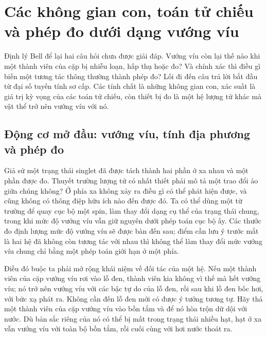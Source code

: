 \chapter{Các không gian con, toán tử chiếu và phép đo dưới dạng vướng víu}

Định lý Bell để lại hai câu hỏi chưa được giải đáp. Vướng víu còn lại thế nào khi một thành viên của cặp bị nhiễu loạn, hấp thụ hoặc đo? Và chính xác thì điều gì biến một tương tác thông thường thành phép đo? Lối đi đến câu trả lời bắt đầu từ đại số tuyến tính sơ cấp. Các tính chất là những không gian con, xác suất là giá trị kỳ vọng của các toán tử chiếu, còn thiết bị đo là một hệ lượng tử khác mà vật thể trở nên vướng víu với nó.

\section{Động cơ mở đầu: vướng víu, tính địa phương và phép đo}

Giả sử một trạng thái singlet đã được tách thành hai phần ở xa nhau và một phần được đo. Thuyết trường lượng tử có nhất thiết phải mô tả một trao đổi ảo giữa chúng không? Ở phía xa không xảy ra điều gì có thể phát hiện được, và cũng không có thông điệp hữu ích nào đến được đó. Ta có thể dùng một từ trường để quay cục bộ một spin, làm thay đổi dạng cụ thể của trạng thái chung, trong khi mức độ vướng víu vẫn giữ nguyên dưới phép toán cục bộ ấy. Các thước đo định lượng mức độ vướng víu sẽ được bàn đến sau; điểm cần lưu ý trước mắt là hai hệ đã không còn tương tác với nhau thì không thể làm thay đổi mức vướng víu chung chỉ bằng một phép toán giới hạn ở một phía.

\begin{classroomqa}
\end{classroomqa}

Điều đó buộc ta phải mở rộng khái niệm về đối tác của một hệ. Nếu một thành viên của cặp vướng víu rơi vào lỗ đen, thành viên kia không vì thế mà hết vướng víu; nó trở nên vướng víu với các bậc tự do của lỗ đen, rồi sau khi lỗ đen bốc hơi, với bức xạ phát ra. Không cần đến lỗ đen mới có được ý tưởng tương tự. Hãy thả một thành viên của cặp vướng víu vào bồn tắm và để nó hòa trộn dữ dội với nước. Dù bản sắc riêng của nó có thể bị mất trong trạng thái nhiều hạt, hạt ở xa vẫn vướng víu với toàn bộ bồn tắm, rồi cuối cùng với hơi nước thoát ra.

